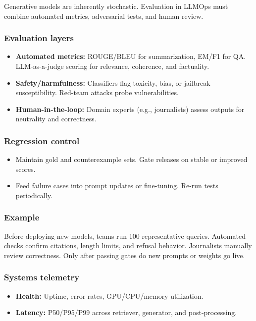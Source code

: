 Generative models are inherently stochastic. Evaluation in LLMOps must combine automated metrics, adversarial tests, and human review.

\subsubsection{Evaluation layers}
\begin{itemize}
    \item \textbf{Automated metrics:} ROUGE/BLEU for summarization, EM/F1 for QA. LLM-as-a-judge scoring for relevance, coherence, and factuality.
    \item \textbf{Safety/harmfulness:} Classifiers flag toxicity, bias, or jailbreak susceptibility. Red-team attacks probe vulnerabilities.
    \item \textbf{Human-in-the-loop:} Domain experts (e.g., journalists) assess outputs for neutrality and correctness. 
\end{itemize}

\subsubsection{Regression control}
\begin{itemize}
    \item Maintain gold and counterexample sets. Gate releases on stable or improved scores.
    \item Feed failure cases into prompt updates or fine-tuning. Re-run tests periodically.
\end{itemize}

\subsubsection{Example}
Before deploying new \ishtar{} models, teams run 100 representative queries. Automated checks confirm citations, length limits, and refusal behavior. Journalists manually review correctness. Only after passing gates do new prompts or weights go live.  

\subsubsection{Systems telemetry}
\begin{itemize}
    \item \textbf{Health:} Uptime, error rates, GPU/CPU/memory utilization.
    \item \textbf{Latency:} P50/P95/P99 across retriever, generator, and post-processing.
\end{itemize}

